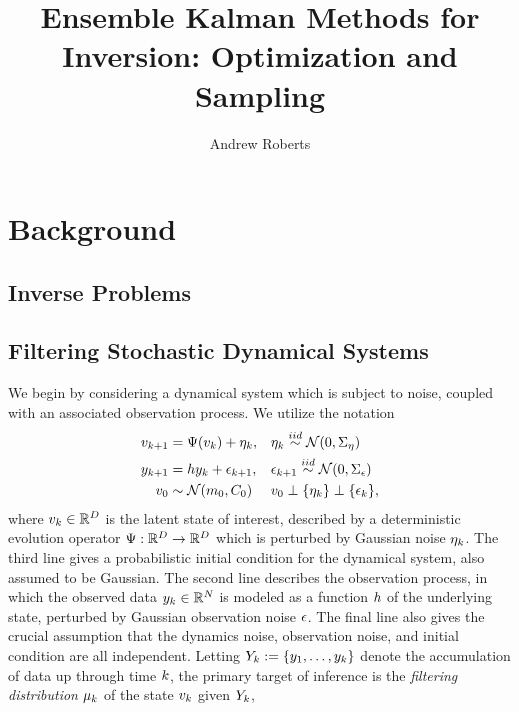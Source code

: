 \documentclass[12pt]{article}
\title{Ensemble Kalman Methods for Inversion: Optimization and Sampling}
\author{Andrew Roberts}
\begin{document}
\maketitle
\newpage

\section{Background}

\subsection{Inverse Problems}

\subsection{Filtering Stochastic Dynamical Systems}
We begin by considering a dynamical system which is subject to noise, coupled with an associated observation process. 
We utilize the notation 
\begin{align}
\dstate[\timeStep+1] &= \fwdOne(\dstate) + \indexTimeStep{\noiseDynamic}, 	  		 &&\indexTimeStep{\noiseDynamic} \overset{iid}{\sim} \Gaussian(0, \CovNoiseDynamic) \label{dynamic_model} \\
\ddataObs[\timeStep+1] &= \obsOp \ddataObs + \indexTimeStep[\timeStep+1]{\noiseObs}, &&\indexTimeStep[\timeStep+1]{\noiseObs} \overset{iid}{\sim} \Gaussian(0, \CovNoiseObs) \nonumber \\
\dstate[0] &\sim \Gaussian(\stateMean[0], \stateCov[0]) && \nonumber \dstate[0] \perp \{\indexTimeStep{\noiseDynamic}\} \perp \{\indexTimeStep{\noiseObs}\}, \nonumber 
\end{align}
where $\dstate \in \R^{\dimState}$ is the latent state of interest, described by a deterministic evolution operator $\fwdOne: \R^{\dimState} \to \R^{\dimState}$ which is perturbed by 
Gaussian noise $\indexTimeStep{\noiseDynamic}$. The third line gives a probabilistic initial condition for the dynamical system, also assumed to be Gaussian. 
The second line describes the observation process, in which the observed data $\ddataObs \in \R^{\dimObs}$ is modeled as a
function $\obsOp$ of the underlying state, perturbed by Gaussian observation noise $\noiseObs$. The final line also gives the crucial assumption that the dynamics noise, observation 
noise, and initial condition are all independent. Letting $\dataObsCum := \{\ddataObs[1], \dots, \ddataObs\}$ denote the accumulation of data up through time $\timeStep$, the primary 
target of inference is the \textit{filtering distribution} $\filterMeas$ of the state $\dstate$ given $\dataObsCum$, 
\end{document}

